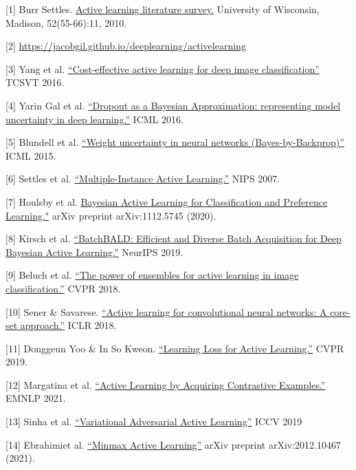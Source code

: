 {[}1{]} Burr Settles. \href{https://burrsettles.com/pub/settles.activelearning.pdf}{Active learning literature survey.} University of Wisconsin, Madison, 52(55-66):11, 2010.

{[}2{]} \url{https://jacobgil.github.io/deeplearning/activelearning}

{[}3{]} Yang et al. \href{https://arxiv.org/abs/1701.03551}{``Cost-effective active learning for deep image classification''} TCSVT 2016.

{[}4{]} Yarin Gal et al. \href{https://arxiv.org/abs/1506.02142}{``Dropout as a Bayesian Approximation: representing model uncertainty in deep learning.''} ICML 2016.

{[}5{]} Blundell et al. \href{https://arxiv.org/abs/1505.05424}{``Weight uncertainty in neural networks (Bayes-by-Backprop)''} ICML 2015.

{[}6{]} Settles et al. \href{https://papers.nips.cc/paper/2007/hash/a1519de5b5d44b31a01de013b9b51a80-Abstract.html}{``Multiple-Instance Active Learning.''} NIPS 2007.

{[}7{]} Houlsby et al. \href{https://arxiv.org/abs/1112.5745}{Bayesian Active Learning for Classification and Preference Learning."} arXiv preprint arXiv:1112.5745 (2020).

{[}8{]} Kirsch et al. \href{https://arxiv.org/abs/1906.08158}{``BatchBALD: Efficient and Diverse Batch Acquisition for Deep Bayesian Active Learning.''} NeurIPS 2019.

{[}9{]} Beluch et al. \href{https://openaccess.thecvf.com/content_cvpr_2018/papers/Beluch_The_Power_of_CVPR_2018_paper.pdf}{``The power of ensembles for active learning in image classification.''} CVPR 2018.

{[}10{]} Sener \& Savarese. \href{https://arxiv.org/abs/1708.00489}{``Active learning for convolutional neural networks: A core-set approach.''} ICLR 2018.

{[}11{]} Donggeun Yoo \& In So Kweon. \href{https://arxiv.org/abs/1905.03677}{``Learning Loss for Active Learning.''} CVPR 2019.

{[}12{]} Margatina et al. \href{https://arxiv.org/abs/2109.03764}{``Active Learning by Acquiring Contrastive Examples.''} EMNLP 2021.

{[}13{]} Sinha et al. \href{https://arxiv.org/abs/1904.00370}{``Variational Adversarial Active Learning''} ICCV 2019

{[}14{]} Ebrahimiet al. \href{https://arxiv.org/abs/2012.10467}{``Minmax Active Learning''} arXiv preprint arXiv:2012.10467 (2021).

